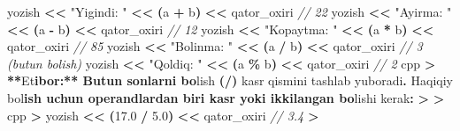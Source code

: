 \documentclass[a4paper,11pt,twoside,openright]{book}
\newenvironment{Shaded}{\begin{snugshade}}{\end{snugshade}}
\newcommand{\CharTok}[1]{\textcolor[rgb]{0.31,0.60,0.02}{#1}}
\newcommand{\CommentTok}[1]{\textcolor[rgb]{0.56,0.35,0.01}{\textit{#1}}}
\newcommand{\ErrorTok}[1]{\textcolor[rgb]{0.64,0.00,0.00}{\textbf{#1}}}
\newcommand{\FloatTok}[1]{\textcolor[rgb]{0.00,0.00,0.81}{#1}}
\newcommand{\NormalTok}[1]{#1}
\newcommand{\OperatorTok}[1]{\textcolor[rgb]{0.81,0.36,0.00}{\textbf{#1}}}
\newcommand{\StringTok}[1]{\textcolor[rgb]{0.31,0.60,0.02}{#1}}
\begin{document}
\begin{Shaded}
\begin{Highlighting}[]
\NormalTok{yozish }\OperatorTok{\textless{}\textless{}} \StringTok{"Yig\textquotesingle{}indi: "} \OperatorTok{\textless{}\textless{}} \OperatorTok{(}\NormalTok{a }\OperatorTok{+}\NormalTok{ b}\OperatorTok{)} \OperatorTok{\textless{}\textless{}}\NormalTok{ qator\_oxiri      }\CommentTok{// 22}
\NormalTok{yozish }\OperatorTok{\textless{}\textless{}} \StringTok{"Ayirma: "} \OperatorTok{\textless{}\textless{}} \OperatorTok{(}\NormalTok{a }\OperatorTok{{-}}\NormalTok{ b}\OperatorTok{)} \OperatorTok{\textless{}\textless{}}\NormalTok{ qator\_oxiri        }\CommentTok{// 12}
\NormalTok{yozish }\OperatorTok{\textless{}\textless{}} \StringTok{"Ko\textquotesingle{}paytma: "} \OperatorTok{\textless{}\textless{}} \OperatorTok{(}\NormalTok{a }\OperatorTok{*}\NormalTok{ b}\OperatorTok{)} \OperatorTok{\textless{}\textless{}}\NormalTok{ qator\_oxiri     }\CommentTok{// 85}
\NormalTok{yozish }\OperatorTok{\textless{}\textless{}} \StringTok{"Bo\textquotesingle{}linma: "} \OperatorTok{\textless{}\textless{}} \OperatorTok{(}\NormalTok{a }\OperatorTok{/}\NormalTok{ b}\OperatorTok{)} \OperatorTok{\textless{}\textless{}}\NormalTok{ qator\_oxiri      }\CommentTok{// 3 (butun bo\textquotesingle{}lish)}
\NormalTok{yozish }\OperatorTok{\textless{}\textless{}} \StringTok{"Qoldiq: "} \OperatorTok{\textless{}\textless{}} \OperatorTok{(}\NormalTok{a }\OperatorTok{\%}\NormalTok{ b}\OperatorTok{)} \OperatorTok{\textless{}\textless{}}\NormalTok{ qator\_oxiri        }\CommentTok{// 2}
\ErrorTok{\textasciigrave{}\textasciigrave{}\textasciigrave{}}\NormalTok{cpp}
\OperatorTok{\textgreater{}} \OperatorTok{**}\NormalTok{E}\CharTok{\textquotesingle{}t}\ErrorTok{ibor:** Butun sonlarni bo}\CharTok{\textquotesingle{}}\NormalTok{lish }\OperatorTok{(}\ErrorTok{\textasciigrave{}}\OperatorTok{/}\ErrorTok{\textasciigrave{}}\OperatorTok{)}\NormalTok{ kasr qismini tashlab yuboradi}\OperatorTok{.}\NormalTok{ Haqiqiy bo}\CharTok{\textquotesingle{}l}\ErrorTok{ish uchun operandlardan biri \textasciigrave{}kasr\textasciigrave{} yoki \textasciigrave{}ikkilangan\textasciigrave{} bo}\CharTok{\textquotesingle{}}\NormalTok{lishi kerak}\OperatorTok{:}
\OperatorTok{\textgreater{}}
\OperatorTok{\textgreater{}} \ErrorTok{\textasciigrave{}\textasciigrave{}\textasciigrave{}}\NormalTok{cpp}
\OperatorTok{\textgreater{}}\NormalTok{ yozish }\OperatorTok{\textless{}\textless{}} \OperatorTok{(}\FloatTok{17.0} \OperatorTok{/} \FloatTok{5.0}\OperatorTok{)} \OperatorTok{\textless{}\textless{}}\NormalTok{ qator\_oxiri   }\CommentTok{// 3.4}
\OperatorTok{\textgreater{}} \ErrorTok{\textasciigrave{}\textasciigrave{}\textasciigrave{}}


\end{Highlighting}
\end{Shaded}
\end{document}
